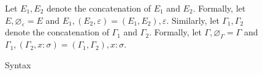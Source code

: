 \documentclass[12pt]{article}
\newcommand\parens[1]{\left( #1 \right)} %
\newcommand\evar{x}
\newcommand\tanno[2]{#1 : #2} %
\newcommand\tx{\sigma}
\newcommand\xeffect{\varepsilon}
\newcommand\xeffects{E}
\newcommand\xempty{\varnothing_{\xeffect}}
\newcommand\xextend[2]{#1, #2}
\newcommand\xunion[2]{#1, #2}
\newcommand\ccontext{\Gamma}
\newcommand\cempty{\varnothing_{\ccontext}}
\newcommand\cextend[2]{#1, #2}
\newcommand\cunion[2]{#1, #2}
\begin{document}
\begin{figure}
\begin{mdframed}
      \bigskip

      Let $\xunion{\xeffects_1}{\xeffects_2}$ denote the concatenation of $\xeffects_1$ and $\xeffects_2$. Formally, let $\xunion{\xeffects}{\xempty} = \xeffects$ and $\xunion{\xeffects_1}{\parens{\xextend{\xeffects_2}{\xeffect}}} = \xextend{\parens{\xunion{\xeffects_1}{\xeffects_2}}}{\xeffect}$. Similarly, let $\cunion{\ccontext_1}{\ccontext_2}$ denote the concatenation of $\ccontext_1$ and $\ccontext_2$. Formally, let $\cunion{\ccontext}{\cempty} = \ccontext$ and $\cunion{\ccontext_1}{\parens{\cextend{\ccontext_2}{\tanno{\evar}{\tx}}}} = \cextend{\parens{\cunion{\ccontext_1}{\ccontext_2}}}{\tanno{\evar}{\tx}}$.

      \caption{Syntax}\label{fig:syntax}
    \end{mdframed}
  \end{figure}
\end{document}

